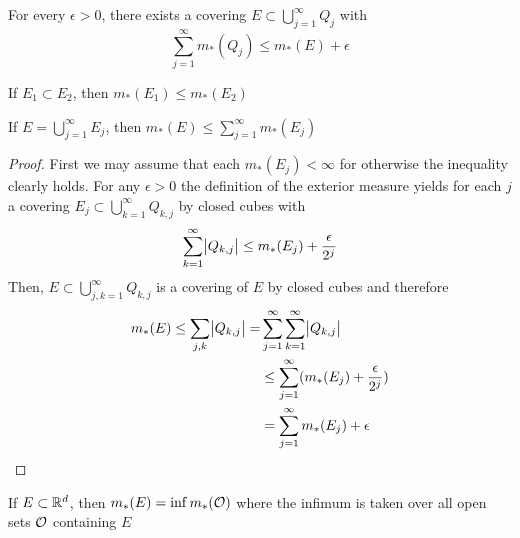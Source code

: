 \documentclass[11pt]{article}
\begin{document}
\begin{proposition}[]
For every \(\epsilon>0\), there exists a covering \(E\subset\bigcup_{j=1}^\infty
   Q_j\) with
\begin{equation*}
\displaystyle\sum_{j=1}^\infty m_*(Q_j)\le m_*(E)+\epsilon
\end{equation*}
\end{proposition}

\begin{proposition}[Monotonicity]
If \(E_1\subset E_2\), then \(m_*(E_1)\le m_*(E_2)\)
\end{proposition}

\begin{proposition}
\label{ob2}
If \(E=\bigcup_{j=1}^\infty E_j\), then \(m_*(E)\le\sum_{j=1}^\infty m_*(E_j)\)
\end{proposition}
\begin{proof}
First we may assume that each \(m_*(E_j)<\infty\) for otherwise the inequality
clearly holds. For any \(\epsilon>0\) the definition of the exterior measure
yields for each \(j\) a covering \(E_j\subset\bigcup_{k=1}^\infty Q_{k,j}\) by
closed cubes with
\begin{equation*}
\displaystyle\sum_{k=1}^\infty\abs{Q_{k,j}}\le m_*(E_j)+\frac{\epsilon}{2^j}
\end{equation*}
Then, \(E\subset\bigcup_{j,k=1}^\infty Q_{k,j}\) is a covering of \(E\) by closed
cubes and therefore
\begin{align*}
m_*(E)\le \displaystyle\sum_{j,k}\abs{Q_{k,j}}=&\displaystyle\sum_{j=1}^\infty
\displaystyle\sum_{k=1}^\infty\abs{Q_{k,j}}\\
&\le \displaystyle\sum_{j=1}^\infty(m_*(E_j)+\frac{\epsilon}{2^j})\\
&=\displaystyle\sum_{j=1}^\infty m_*(E_j)+\epsilon
\end{align*}
\end{proof}

\begin{proposition}[]
If \(E\subset\mathbb{R}^d\), then \(m_*(E)=\inf m_*(\mathcal{O})\) where the infimum is taken
over all open sets \(\mathcal{O}\) containing \(E\)
\end{proposition}
\end{document}
